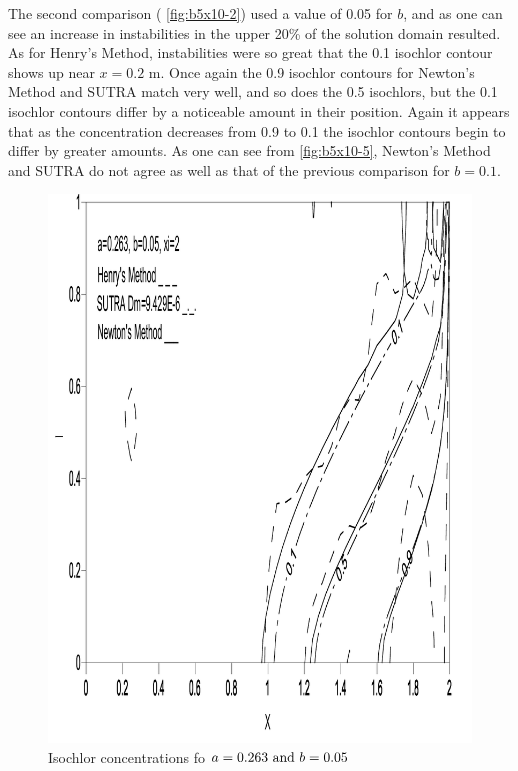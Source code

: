 The second comparison ( \autoref{fig:b5x10-2}) used a value of 0.05 for $b$, and as one
can see an increase in instabilities in the upper 20\% of the solution domain resulted. As for
Henry's Method, instabilities were so great that the 0.1 isochlor contour shows up near $x=0.2
\text{ m} $. Once again the 0.9 isochlor contours for Newton's Method and SUTRA match very well, and
so does the 0.5 isochlors, but the 0.1 isochlor contours differ by a noticeable amount in their
position. Again it appears that as the concentration decreases from 0.9 to 0.1 the isochlor contours
begin to differ by greater amounts. As one can see from \autoref{fig:b5x10-5}, Newton's
Method and SUTRA do not agree as well as that of the previous comparison for $b=0.1$.

\begin{figure}[htp]
    \centering
    \includegraphics[totalheight=0.45 \textheight,viewport=3mm 4mm 205mm 292mm]
    {image3}
    \caption{Isochlor concentrations fo $a = 0.263 \text{ and } b =
    0.05$} \label{fig:b5x10-2}
\end{figure}

